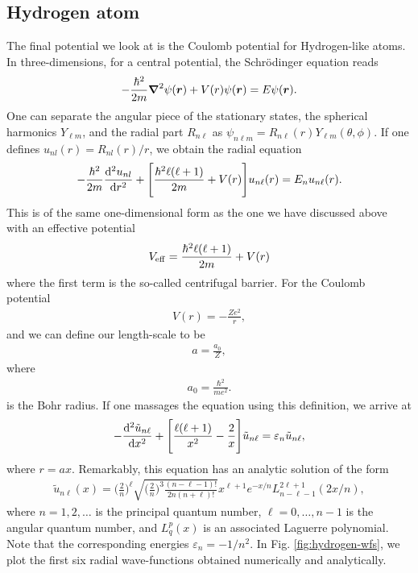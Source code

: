 \subsection{Hydrogen atom}
\label{ssec:hydrogen-atom}

The final potential we look at is the Coulomb potential for Hydrogen-like atoms.
In three-dimensions, for a central potential, the Schr\"{o}dinger equation reads
\begin{align}
    -\frac{\hbar^2}{2m} \grad^2 \psi(\vb*{r}) + V(r) \psi(\vb*{r}) = E \psi(\vb*{r})
.\end{align}
One can separate the angular piece of the stationary states, the spherical harmonics $Y_{\ell m}$, and the radial part $R_{n \ell}$ as $\psi_{n \ell m} = R_{n \ell}(r) Y_{\ell m}(\theta,\phi)$.
If one defines $u_{nl}(r) = R_{nl}(r) / r$, we obtain the radial equation
\begin{align}
    -\frac{\hbar^2}{2m} \dv[2]{u_{nl}}{r} + \Bigg[ \frac{\hbar^2 \ell(\ell + 1)}{2m} + V(r) \Bigg] u_{n \ell}(r) = E_{n} u_{n \ell}(r)
.\end{align}
This is of the same one-dimensional form as the one we have discussed above with an effective potential
\begin{align}
    V_{\rm eff} = \frac{\hbar^2 \ell (\ell + 1)}{2m} + V(r)
\end{align}
where the first term is the so-called centrifugal barrier.
For the Coulomb potential
\begin{align}
    V(r) = -\frac{Z e^2}{r}
,\end{align}
and we can define our length-scale to be 
\begin{align}
    a = \frac{a_0}{Z}
,\end{align}
where 
\begin{align}
    a_0 = \frac{\hbar^2}{m e^2}
.\end{align}
is the Bohr radius.
If one massages the equation using this definition, we arrive at
\begin{align}
    -\dv[2]{\tilde{u}_{n\ell}}{x} + \Bigg[ \frac{\ell (\ell + 1)}{x^2} - \frac{2}{x} \Bigg] \tilde{u}_{n \ell} = \varepsilon_{n} \tilde{u}_{n \ell}
,\end{align}
where $r = a x$.
Remarkably, this equation has an analytic solution of the form
\begin{align}
    \tilde{u}_{n \ell}(x) = \Big( \frac{2}{n} \Big)^{\ell} \sqrt{\Big( \frac{2}{n} \Big)^3 \frac{(n - \ell - 1)!}{2n (n + \ell)!}} x^{\ell + 1} e^{-x/n} L_{n-\ell-1}^{2 \ell + 1}(2x/n)
,\end{align}
where $n = 1,2,\ldots$ is the principal quantum number, $\ell = 0,\ldots,n-1$ is the angular quantum number, and $L_{q}^{p}(x)$ is an associated Laguerre polynomial.
Note that the corresponding energies $\varepsilon_{n} = -1/n^2$.
In Fig. \ref{fig:hydrogen-wfs}, we plot the first six radial wave-functions obtained numerically and analytically.

